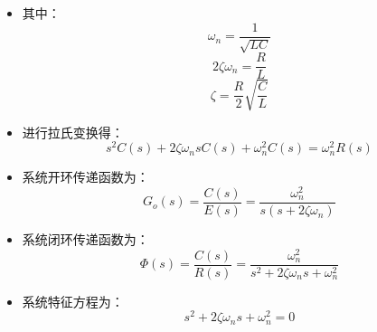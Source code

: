  \begin{frame}
 \begin{block}{}
 \begin{itemize}
 \item<+-> 其中：
 \[\omega_n=\frac{1}{\sqrt{LC}}\]
 \[2\zeta\omega_n=\frac{R}{L}\]
 \[\zeta=\frac{R}{2}\sqrt{\frac{C}{L}}\]
\end{itemize}  
\end{block}
\end{frame}

\begin{frame}
\begin{block}{}
\begin{itemize}
\item<+-> 进行拉氏变换得：
\[s^2C(s)+2\zeta\omega_nsC(s)+\omega_n^2C(s)=\omega_n^2R(s)\]
\item<+-> 系统开环传递函数为：
\[G_o(s)=\frac{C(s)}{E(s)}=\frac{\omega^2_n}{s(s+2\zeta\omega_n)}\]
\end{itemize}
\end{block}
\end{frame}
\begin{frame}
\begin{block}{}
\begin{itemize}
\item<+-> 系统闭环传递函数为：
\[\Phi(s)=\frac{C(s)}{R(s)}=\frac{\omega_n^2}{s^2+2\zeta\omega_ns+\omega_n^2}\]
\item<+-> 系统特征方程为：
\[s^2+2\zeta\omega_ns+\omega_n^2=0\]
\end{itemize}
\end{block}
\end{frame}
\begin{frame}
\end{frame}

